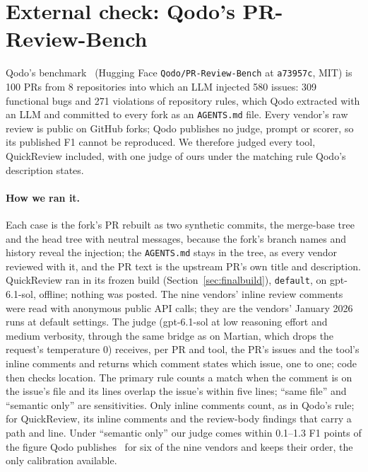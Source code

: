 \documentclass[11pt,a4paper]{article}
\newcommand{\qcr}{QuickReview}
\newcommand{\code}[1]{\texttt{#1}}
\begin{document}
\section{External check: Qodo's PR-Review-Bench}
\label{sec:qodo}

Qodo's benchmark~\cite{qodobench} (Hugging Face \code{Qodo/PR-Review-Bench}
at \code{a73957c}, MIT) is 100 PRs from 8 repositories into which an LLM
injected 580 issues: 309 functional bugs and 271 violations of repository
rules, which Qodo extracted with an LLM and committed to every fork as an
\code{AGENTS.md} file. Every vendor's raw review is public on GitHub forks;
Qodo publishes no judge, prompt or scorer, so its published F1 cannot be
reproduced. We therefore judged every tool, \qcr{} included, with one judge
of ours under the matching rule Qodo's description states.

\paragraph{How we ran it.} Each case is the fork's PR rebuilt as two
synthetic commits, the merge-base tree and the head tree with neutral
messages, because the fork's branch names and history reveal the injection;
the \code{AGENTS.md} stays in the tree, as every vendor reviewed with it, and
the PR text is the upstream PR's own title and description. \qcr{} ran in
its frozen build (Section~\ref{sec:finalbuild}), \code{default}, on
gpt-6.1-sol, offline; nothing was posted. The nine vendors' inline review
comments were read with anonymous public API calls; they are the vendors'
January 2026 runs at default settings. The judge (gpt-6.1-sol at low
reasoning effort and medium verbosity, through the same bridge as on
Martian, which drops the request's temperature 0) receives, per PR and
tool, the PR's issues and the tool's inline
comments and returns which comment states which issue, one to one; code then
checks location. The primary rule counts a match when the comment is on the
issue's file and its lines overlap the issue's within five lines; ``same
file'' and ``semantic only'' are sensitivities. Only inline comments count,
as in Qodo's rule; for \qcr{}, its inline comments and the review-body
findings that carry a path and line. Under ``semantic only'' our judge comes
within 0.1--1.3 F1 points of the figure Qodo publishes~\cite{qodobench} for six
of the nine vendors and keeps their order, the only calibration available.
\end{document}
